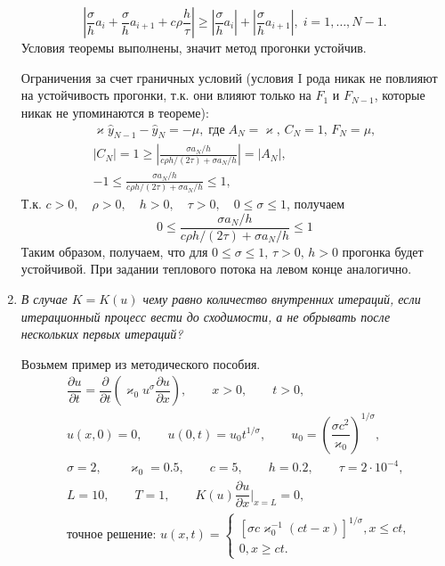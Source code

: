 \documentclass[12pt, a4paper]{article}
\begin{document}
\begin{enumerate}
		\[
		\left|\frac{\sigma}{h}a_i+\frac{\sigma}{h}a_{i+1}+c\rho\frac{h}{\tau}\right|\ge\left|\frac{\sigma}{h}a_i\right|+\left|\frac{\sigma}{h}a_{i+1}\right|,\;i=1,\dots,N-1.
		\]
		Условия теоремы выполнены, значит метод прогонки устойчив.
		
		Ограничения за счет граничных условий (условия I рода никак не повлияют на устойчивость прогонки, т.к. они влияют только на $F_1$ и $F_{N-1}$, которые никак не упоминаются в теореме):
		\begin{gather*}
			\varkappa \hat y_{N-1}-\hat y_N=-\mu,\; \text{где}\; A_N = \varkappa,\, C_N=1,\,F_N=\mu,\\
			|C_N|=1\ge\left|\frac{\sigma a_N/h}{c\rho h/(2\tau)+\sigma a_N/h}\right|=|A_N|,\\
			-1\le\frac{\sigma a_N/h}{c\rho h/(2\tau)+\sigma a_N/h}\le1,
		\end{gather*}
		Т.к. $c>0,\quad \rho>0,\quad h>0,\quad\tau>0,\quad0\le\sigma\le1$, получаем
		\[
		0\le\frac{\sigma a_N/h}{c\rho h/(2\tau)+\sigma a_N/h}\le1
		\]
		Таким образом, получаем, что для $0\le\sigma\le1,\, \tau>0,\,h>0$ прогонка будет устойчивой.
		При задании теплового потока на левом конце аналогично.
		
		\item \textit{В случае $K=K(u)$ чему равно количество внутренних итераций, если итерационный процесс вести до сходимости, а не обрывать после нескольких первых итераций?}
		\smallskip
		
		Возьмем пример из методического пособия.
		\begin{eqnarray*}
			& \dfrac{\partial u}{\partial t} = \dfrac{\partial}{\partial t}\left(\varkappa_0 u^\sigma \dfrac{\partial u}{\partial x}\right), \qquad x > 0, \qquad t > 0,\\
			& u(x, 0) = 0, \qquad u(0, t) = u_0 t^{1/\sigma}, \qquad u_0 = \left(\dfrac{\sigma c^2}{\varkappa_0}\right)^{1/\sigma},\\
			& \sigma = 2, \qquad \varkappa_0 = 0.5, \qquad c = 5, \qquad h = 0.2, \qquad \tau=2 \cdot 10^{-4},\\
			& L = 10, \qquad T = 1, \qquad K(u) \dfrac{\partial u}{\partial x}\Bigg|_{x = L} = 0,\\
			& \textrm{точное решение: } u(x, t) = \begin{cases}
				[\sigma c \varkappa_0^{-1}(ct-x)]^{1/\sigma}, x \le ct,\\
				0, x \ge ct.
			\end{cases}
		\end{eqnarray*}
		

\end{enumerate}
\end{document}
